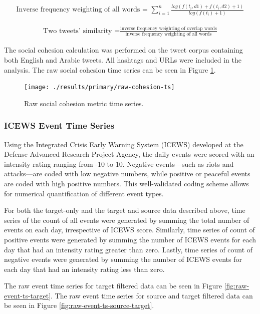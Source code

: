\documentclass[english,man]{apa6}
\begin{document}
\begin{align}
\text{Inverse frequency weighting of all words = }\sum_{i=1}^n \frac{log(f(t_i,
d1) + f(t_i, d2) + 1)}{log(f(t_i) + 1)}
\end{align}

\begin{align}
\text{Two tweets' similarity =}\frac{\text{inverse frequency weighting of overlap
words}}{\text{inverse frequency weighting of all words}}
\end{align}

\noindent The social cohesion calculation was performed on the tweet corpus
containing both English and Arabic tweets. All hashtags and URLs were included
in the analysis. The raw social cohesion time series can be seen in Figure
\ref{fig:raw-cohesion-ts}.

\begin{figure}
\texttt{[image: ./results/primary/raw-cohesion-ts]} \caption{Raw social cohesion metric time series.}\label{fig:raw-cohesion-ts}
\end{figure}

\hypertarget{icews-event-time-series}{%
\subsubsection{ICEWS Event Time Series}\label{icews-event-time-series}}

Using the Integrated Crisis Early Warning System (ICEWS) developed at the
Defense Advanced Research Project Agency, the daily events were scored with an
intensity rating ranging from -10 to 10. Negative events---such as riots and
attacks---are coded with low negative numbers, while positive or peaceful events
are coded with high positive numbers. This well-validated coding scheme allows
for numerical quantification of different event types.

For both the target-only and the target and source data described above, time
series of the count of all events were generated by summing the total number of
events on each day, irrespective of ICEWS score. Similarly, time series of count
of positive events were generated by summing the number of ICEWS events for each
day that had an intensity rating greater than zero. Lastly, time series of count
of negative events were generated by summing the number of ICEWS events for each
day that had an intensity rating less than zero.

The raw event time series for target filtered data can be seen in Figure
\ref{fig:raw-event-ts-target}. The raw event time series for source and target
filtered data can be seen in Figure \ref{fig:raw-event-ts-source-target}.
\end{document}
